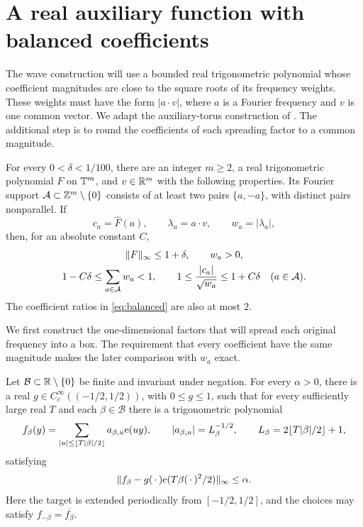 \section{A real auxiliary function with balanced coefficients}\label{sec:balanced}

The wave construction will use a bounded real trigonometric polynomial
whose coefficient magnitudes are close to the square roots of its
frequency weights.  These weights must have the form $|a\cdot v|$, where
$a$ is a Fourier frequency and $v$ is one common vector.  We adapt the auxiliary-torus construction of
\cite[Section~2]{OpenAILowerEnvelope2026}.  The additional step is to
round the coefficients of each spreading factor to a common magnitude.

\begin{proposition}\label{prop:balanced}
For every $0<\delta<1/100$, there are an integer $m\ge2$, a real
trigonometric polynomial $F$ on $\mathbb T^m$, and $v\in\mathbb R^m$ with the
following properties.  Its Fourier support
$\mathcal A\subset\mathbb Z^m\setminus\{0\}$ consists of at least two pairs
$\{a,-a\}$, with distinct pairs nonparallel.  If
\[
 c_a=\widehat F(a),\qquad \lambda_a=a\cdot v,\qquad w_a=|\lambda_a|,
\]
then, for an absolute constant $C$,
\begin{equation}\label{eq:balanced}
 \begin{gathered}
 \lVert F\rVert_\infty\le1+\delta,\qquad w_a>0,\\
 1-C\delta\le\sum_{a\in\mathcal A}w_a<1,\qquad
 1\le\frac{|c_a|}{\sqrt{w_a}}\le1+C\delta
 \quad(a\in\mathcal A).
 \end{gathered}
\end{equation}
The coefficient ratios in \eqref{eq:balanced} are also at most $2$.
\end{proposition}

We first construct the one-dimensional factors that will spread each
original frequency into a box.  The requirement that every coefficient
have the same magnitude makes the later comparison with $w_a$ exact.

\begin{lemma}
\label{lem:equal-modulus-spreading}
Let $\mathcal B\subset\mathbb R\setminus\{0\}$ be finite and invariant under
negation.  For every $\alpha>0$, there is a real
$g\in C_c^\infty((-1/2,1/2))$, with $0\le g\le1$, such that for every
sufficiently large real $T$ and each $\beta\in\mathcal B$ there is a
trigonometric polynomial
\[
 f_\beta(y)=\sum_{|u|\le\lfloor T|\beta|/2\rfloor}a_{\beta,u}\mathrm e(uy),
 \qquad
 |a_{\beta,u}|=L_\beta^{-1/2},\qquad
 L_\beta=2\lfloor T|\beta|/2\rfloor+1,
\]
satisfying
\begin{equation}\label{eq:spreading-approximation}
 \lVert f_\beta-g(\,\cdot\,)\mathrm e(T\beta(\,\cdot\,)^2/2)\rVert_\infty\le\alpha.
\end{equation}
Here the target is extended periodically from $[-1/2,1/2]$, and the
choices may satisfy $f_{-\beta}=\overline{f_\beta}$.
\end{lemma}

